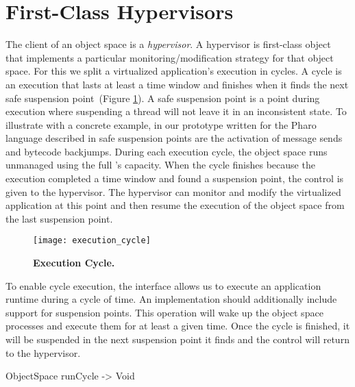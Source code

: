 
\section{First-Class Hypervisors}\label{sec:hypervisor}

The client of an object space is a \emph{hypervisor}. A hypervisor is first-class object that implements a particular monitoring/modification strategy for that object space. For this we split a virtualized application's execution in cycles. A cycle is an execution that lasts at least a time window and finishes when it finds the next safe suspension point~(Figure \ref{fig:execution_cycle}). A safe suspension point is a point during execution where suspending a thread will not leave it in an inconsistent state. To illustrate with a concrete example, in our \Vtt prototype written for the Pharo language described in  safe suspension points are the activation of message sends and bytecode backjumps. During each execution cycle, the object space runs unmanaged using the full \VM's capacity. When the cycle finishes because the execution completed a time window and found a suspension point, the control is given to the hypervisor. The hypervisor can monitor and modify the virtualized application at this point and then resume the execution of the object space from the last suspension point.

\begin{figure}[ht]
\center
\texttt{[image: execution\_cycle]}
\caption{\textbf{Execution Cycle.} \label{fig:execution_cycle}}
\end{figure}

To enable cycle execution, the  interface allows us to execute an application runtime during a cycle of time. An \Vtt implementation should additionally include support for suspension points. This operation will wake up the object space processes and execute them for at least a given time. Once the cycle is finished, it will be suspended in the next suspension point it finds and the control will return to the hypervisor.

\begin{code}
ObjectSpace {
    runCycle -> Void
}
\end{code}


